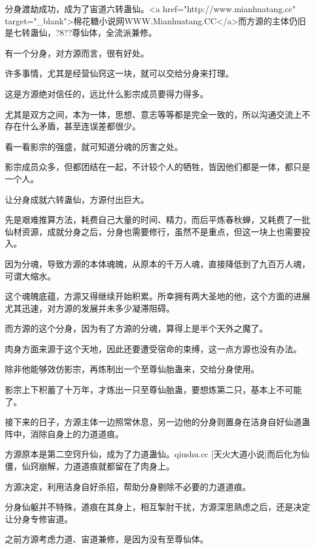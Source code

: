 
\begin{this_body}

分身渡劫成功，成为了宙道六转蛊仙。<a href="http://www.mianhuatang.cc" target="\_blank">棉花糖小说网WWW.Mianhuatang.CC</a>而方源的主体仍旧是七转蛊仙，?8??尊仙体，全流派兼修。

有一个分身，对方源而言，很有好处。

许多事情，尤其是经营仙窍这一块，就可以交给分身来打理。

这是方源绝对信任的，远比什么影宗成员要得力得多。

尤其是双方之间，本为一体，思想、意志等等都是完全一致的，所以沟通交流上不存在什么矛盾，甚至连误差都很少。

看一看影宗的强盛，就可知道分魂的厉害之处。

影宗成员众多，但都团结在一起，不计较个人的牺牲，皆因他们都是一体，都只是一个人。

让分身成就六转蛊仙，方源付出巨大。

先是艰难推算方法，耗费自己大量的时间、精力，而后平炼春秋蝉，又耗费了一批仙材资源，成就分身之后，分身也需要修行，虽然不是重点，但这一块上也需要投入。

因为分魂，导致方源的本体魂魄，从原本的千万人魂，直接降低到了九百万人魂，可谓大缩水。

这个魂魄底蕴，方源又得继续开始积累。所幸拥有两大圣地的他，这个方面的进展尤其迅速，对方源的发展并未多少凝滞阻碍。

而方源的这个分身，因为有了方源的分魂，算得上是半个天外之魔了。

肉身方面来源于这个天地，因此还要遭受宿命的束缚，这一点方源也没有办法。

除非他能够效仿影宗，再炼制出一个至尊仙胎蛊来，交给分身使用。

影宗上下积蓄了十万年，才炼出一只至尊仙胎蛊，要想炼第二只，基本上不可能了。

接下来的日子，方源主体一边照常休息，另一边他的分身则置身在洁身自好仙道蛊阵中，消除自身上的力道道痕。

方源原本是第二空窍升仙，成为了力道蛊仙。qiushu.cc [天火大道小说]而后化为仙僵，仙窍崩解，力道道痕就都留在了肉身上。

方源决定，利用洁身自好杀招，帮助分身剔除不必要的力道道痕。

分身仙躯并不特殊，道痕在其身上，相互掣肘干扰，方源深思熟虑之后，还是决定让分身专修宙道。

之前方源考虑力道、宙道兼修，是因为没有至尊仙体。


\end{this_body}
